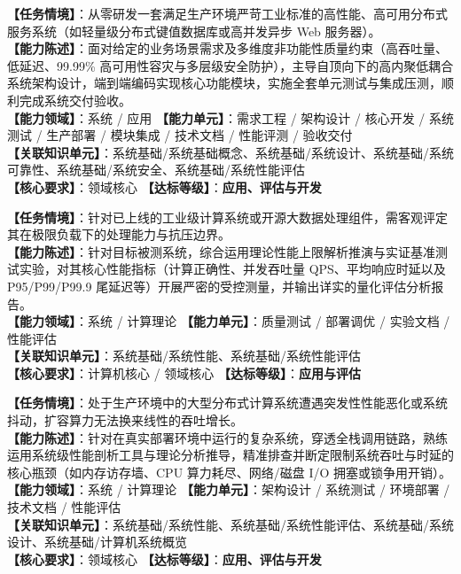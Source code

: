\begin{taskbox}[任务 4：端到端高可用系统架构设计与工程研发]
\textbf{【任务情境】}：从零研发一套满足生产环境严苛工业标准的高性能、高可用分布式服务系统（如轻量级分布式键值数据库或高并发异步 Web 服务器）。\\
\textbf{【能力陈述】}：面对给定的业务场景需求及多维度非功能性质量约束（高吞吐量、低延迟、99.99\% 高可用性容灾与多层级安全防护），主导自顶向下的高内聚低耦合系统架构设计，端到端编码实现核心功能模块，实施全套单元测试与集成压测，顺利完成系统交付验收。\\
\textbf{【能力领域】}：系统 / 应用 \quad \textbf{【能力单元】}：需求工程 / 架构设计 / 核心开发 / 系统测试 / 生产部署 / 模块集成 / 技术文档 / 性能评测 / 验收交付\\
\textbf{【关联知识单元】}：系统基础/系统基础概念、系统基础/系统设计、系统基础/系统可靠性、系统基础/系统安全、系统基础/系统性能评估\\
\textbf{【核心要求】}：领域核心 \quad \textbf{【达标等级】}：\textbf{应用、评估与开发}
\end{taskbox}

\begin{taskbox}[任务 5：评测指定系统的多维综合性能指标]
\textbf{【任务情境】}：针对已上线的工业级计算系统或开源大数据处理组件，需客观评定其在极限负载下的处理能力与抗压边界。\\
\textbf{【能力陈述】}：针对目标被测系统，综合运用理论性能上限解析推演与实证基准测试实验，对其核心性能指标（计算正确性、并发吞吐量 QPS、平均响应时延以及 P95/P99/P99.9 尾延迟等）开展严密的受控测量，并输出详实的量化评估分析报告。\\
\textbf{【能力领域】}：系统 / 计算理论 \quad \textbf{【能力单元】}：质量测试 / 部署调优 / 实验文档 / 性能评估\\
\textbf{【关联知识单元】}：系统基础/系统性能、系统基础/系统性能评估\\
\textbf{【核心要求】}：计算机核心 / 领域核心 \quad \textbf{【达标等级】}：\textbf{应用与评估}
\end{taskbox}

\begin{taskbox}[任务 6：精准诊断与定位复杂系统的性能瓶颈]
\textbf{【任务情境】}：处于生产环境中的大型分布式计算系统遭遇突发性性能恶化或系统抖动，扩容算力无法换来线性的吞吐增长。\\
\textbf{【能力陈述】}：针对在真实部署环境中运行的复杂系统，穿透全栈调用链路，熟练运用系统级性能剖析工具与理论分析推导，精准排查并断定限制系统吞吐与时延的核心瓶颈（如内存访存墙、CPU 算力耗尽、网络/磁盘 I/O 拥塞或锁争用开销）。\\
\textbf{【能力领域】}：系统 / 计算理论 \quad \textbf{【能力单元】}：架构设计 / 系统测试 / 环境部署 / 技术文档 / 性能评估\\
\textbf{【关联知识单元】}：系统基础/系统性能、系统基础/系统性能评估、系统基础/系统设计、系统基础/计算机系统概览\\
\textbf{【核心要求】}：领域核心 \quad \textbf{【达标等级】}：\textbf{应用、评估与开发}
\end{taskbox}

